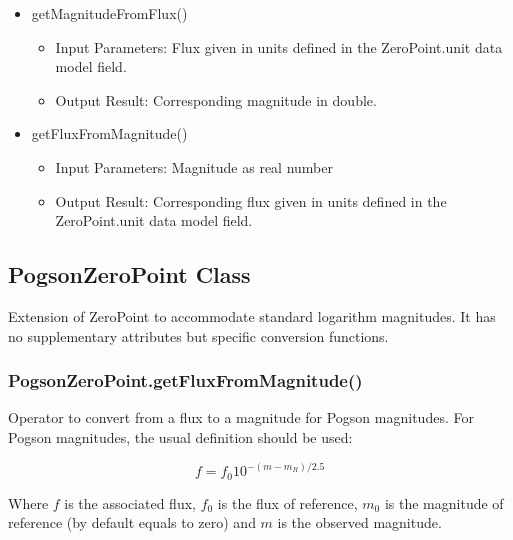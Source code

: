\documentclass[11pt,a4paper]{ivoa}
\begin{document}
\begin{itemize}
	\item getMagnitudeFromFlux()\par

\begin{itemize}
	\item{Input Parameters: Flux given in units defined in the 
	ZeroPoint.unit data model field.\par}

	\item{Output Result: Corresponding magnitude in double.\par}


\vspace{\baselineskip}

\end{itemize}
	\item  getFluxFromMagnitude()\par

\begin{itemize}
	\item{Input Parameters: Magnitude as real number\par}

	\item{Output Result: Corresponding flux given in units defined in 
	the ZeroPoint.unit data model field.}
\end{itemize}
\end{itemize}
\par


\subsection{PogsonZeroPoint Class}
Extension of ZeroPoint to accommodate standard logarithm magnitudes. It 
has no supplementary attributes but specific conversion functions.
\par

\subsubsection{PogsonZeroPoint.getFluxFromMagnitude()}
Operator to convert from a flux to a magnitude for Pogson magnitudes. For 
Pogson magnitudes, the usual definition should be used:
\par
\begin{equation} \label{eq:25}
f = f_0 10^{-(m-m_R)/2.5}
\end{equation}

Where $f$ is the associated flux, $f_0$ is the flux of reference, $m_0$ is 
the magnitude of reference (by default equals to zero) and $m$ is the 
observed magnitude.
\par
\end{document}
